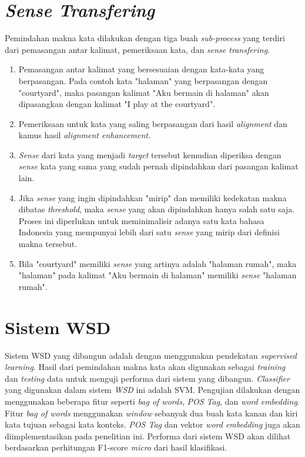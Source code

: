 \section{\textit{Sense Transfering}} \label{sec:Sense Transfering}
Pemindahan makna kata dilakukan dengan tiga buah \textit{sub-process} yang terdiri dari pemasangan antar kalimat, pemeriksaan kata, dan \textit{sense transfering}.
\begin{enumerate}
	\item Pemasangan antar kalimat yang bersesuaian dengan kata-kata yang berpasangan. Pada contoh kata "halaman" yang berpasangan dengan "courtyard", maka pasangan kalimat "Aku bermain di halaman" akan dipasangkan dengan kalimat "I play at the courtyard".
	\item Pemeriksaan untuk kata yang saling berpasangan dari hasil \textit{alignment} dan kamus hasil \textit{alignment enhancement}.
	\item \textit{Sense} dari kata yang menjadi \textit{target} tersebut kemudian diperiksa dengan \textit{sense} kata yang sama yang sudah pernah dipindahkan dari pasangan kalimat lain. 
	\item Jika \textit{sense} yang ingin dipindahkan "mirip" dan memiliki kedekatan makna dibatas \textit{threshold}, maka \textit{sense} yang akan dipindahkan hanya salah satu saja. Proses ini diperlukan untuk meminimalisir adanya satu kata bahasa Indonesia yang mempunyai lebih dari satu \textit{sense} yang mirip dari definisi makna tersebut.
	\item Bila "courtyard" memiliki \textit{sense} yang artinya adalah "halaman rumah", maka "halaman" pada kalimat "Aku bermain di halaman" memiliki \textit{sense} "halaman rumah".
\end{enumerate}

\section{Sistem WSD} \label{sec:Sistem WSD}
Sistem WSD yang dibangun adalah dengan menggunakan pendekatan \textit{supervised learning}. Hasil dari pemindahan makna kata akan digunakan sebagai \textit{training} dan \textit{testing} data untuk menguji performa dari sistem yang dibangun. \textit{Classifier} yang digunakan dalam sistem \textit{WSD} ini adalah SVM. Pengujian dilakukan dengan menggunakan beberapa fitur seperti \textit{bag of words}, \textit{POS Tag}, dan \textit{word embedding}. Fitur \textit{bag of words} menggunakan \textit{window} sebanyak dua buah kata kanan dan kiri kata tujuan sebagai kata konteks. \textit{POS Tag} dan vektor \textit{word embedding} juga akan diimplementasikan pada penelitian ini. Performa dari sistem WSD akan dilihat berdasarkan perhitungan F1-score \textit{micro} dari hasil klasifikasi.